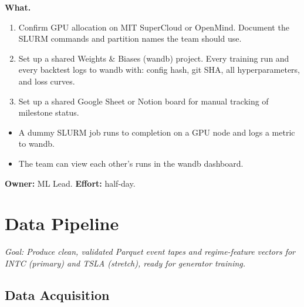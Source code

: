 \documentclass[11pt,a4paper]{article}
\begin{document}
\textbf{What.}
\begin{enumerate}[nosep]
  \item Confirm GPU allocation on MIT SuperCloud or OpenMind.  Document the SLURM commands and partition names the team should use.
  \item Set up a shared Weights \& Biases (wandb) project.  Every training run and every backtest logs to wandb with: config hash, git SHA, all hyperparameters, and loss curves.
  \item Set up a shared Google Sheet or Notion board for manual tracking of milestone status.
\end{enumerate}

\begin{successbox}
  \begin{itemize}[nosep]
    \item A dummy SLURM job runs to completion on a GPU node and logs a metric to wandb.
    \item The team can view each other's runs in the wandb dashboard.
  \end{itemize}
\end{successbox}

\textbf{Owner:} ML Lead. \quad \textbf{Effort:} half-day.


\section{Data Pipeline}

\textit{Goal: Produce clean, validated Parquet event tapes and regime-feature vectors for INTC (primary) and TSLA (stretch), ready for generator training.}

\subsection{Data Acquisition}
\end{document}
